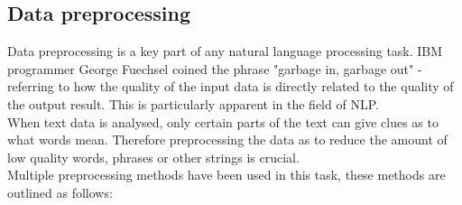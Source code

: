 \documentclass[conference]{IEEEtran}
\begin{document}
\subsection{Data preprocessing}
Data preprocessing is a key part of any natural language processing task. IBM programmer George Fuechsel coined the phrase "garbage in, garbage out" - referring to how the quality of the input data is directly related to the quality of the output result. This is particularly apparent in the field of NLP.\\
When text data is analysed, only certain parts of the text can give clues as to what words mean. Therefore preprocessing the data as to reduce the amount of low quality words, phrases or other strings is crucial.\\
Multiple preprocessing methods have been used in this task, these methods are outlined as follows:
\end{document}
